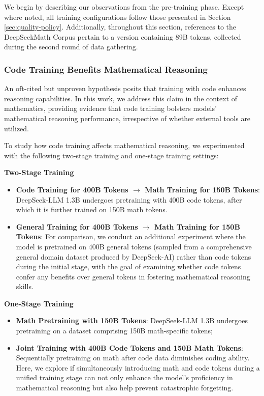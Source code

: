 \begin{itemize}[topsep=0pt]
\begin{itemize}[topsep=0pt]
We begin by describing our observations from the pre-training phase. Except where noted, all training configurations follow those presented in Section \ref{sec:quality-policy}. Additionally, throughout this section, references to the DeepSeekMath Corpus pertain to a version containing 89B tokens, collected during the second round of data gathering.

\subsubsection{Code Training Benefits Mathematical Reasoning}

An oft-cited but unproven hypothesis posits that training with code enhances reasoning capabilities. In this work, we address this claim in the context of mathematics, providing evidence that code training bolsters models’ mathematical reasoning performance, irrespective of whether external tools are utilized.

To study how code training affects mathematical reasoning, we experimented with the following two-stage training and one-stage training settings:

\textbf{Two-Stage Training}

\begin{itemize}[topsep=0pt]
    \item \textbf{Code Training for 400B Tokens $\rightarrow$ Math Training for 150B Tokens}: DeepSeek-LLM 1.3B undergoes pretraining with 400B code tokens, after which it is further trained on 150B math tokens.
    \item \textbf{General Training for 400B Tokens $\rightarrow$ Math Training for 150B Tokens}: For comparison, we conduct an additional experiment where the model is pretrained on 400B general tokens (sampled from a comprehensive general domain dataset produced by DeepSeek-AI) rather than code tokens during the initial stage, with the goal of examining whether code tokens confer any benefits over general tokens in fostering mathematical reasoning skills.
\end{itemize}

\textbf{One-Stage Training}

\begin{itemize}[topsep=0pt]
    \item \textbf{Math Pretraining with 150B Tokens}: DeepSeek-LLM 1.3B undergoes pretraining on a dataset comprising 150B math-specific tokens;
    \item \textbf{Joint Training with 400B Code Tokens and 150B Math Tokens}: Sequentially pretraining on math after code data diminishes coding ability. Here, we explore if simultaneously introducing math and code tokens during a unified training stage can not only enhance the model’s proficiency in mathematical reasoning but also help prevent catastrophic forgetting.
\end{itemize}


\end{itemize}
\end{itemize}
